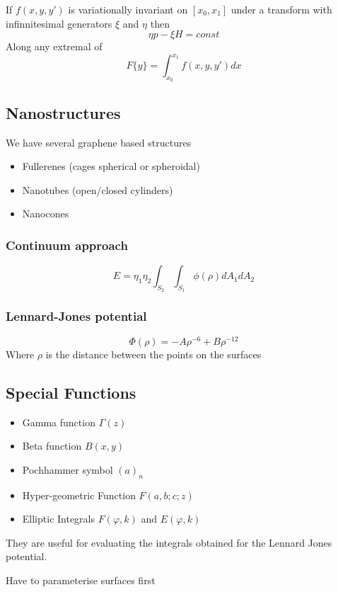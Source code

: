 \documentclass{E:/Documents/Latex/myassignment}
\begin{document}
If $f(x,y,y')$ is variationally invariant on $[x_0,x_1]$ under a transform with infinnitesimal generators $\xi$ and $\eta$ then
\[\eta p - \xi H = const\]
Along any extremal of
\[F\{y\} = \int_{x_0}^{x_1} f(x,y,y') dx\]



\subsection{Nanostructures}
We have several graphene based structures
\begin{itemize}
	\item Fullerenes (cages spherical or spheroidal)
	\item Nanotubes (open/closed cylinders)
	\item Nanocones
\end{itemize}
\subsubsection{Continuum approach}
\[E = \eta_1 \eta_2 \int_{S_2} \int_{S_1} \phi(\rho) dA_1 dA_2\]
\subsubsection{Lennard-Jones potential}
\[\Phi(\rho) = -A\rho^{-6} + B \rho^{-12}\]
Where $\rho$ is the distance between the points on the surfaces


\subsection{Special Functions}
\begin{itemize}
	\item Gamma function $\Gamma(z)$
	\item Beta function $B(x,y)$
	\item Pochhammer symbol $(a)_n$
	\item Hyper-geometric Function $F(a,b;c;z)$
	\item Elliptic Integrals $F(\varphi, k)$ and $E(\varphi,k)$ 
\end{itemize}
They are useful for evaluating the integrals obtained for the Lennard Jones potential. 

Have to parameterise surfaces first















	
\end{document}
